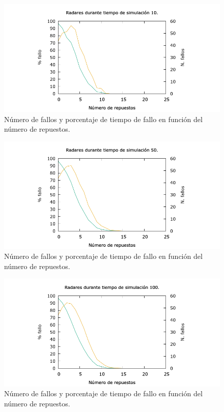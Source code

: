 \documentclass[12pt, spanish]{article}
\begin{document}
\begin{figure}[H]
	\centering
	\includegraphics[scale = 0.6]{radares_10.png}
	\caption{Número de fallos y porcentaje de tiempo de fallo en función del número de repuestos.}
	\label{fig:ej4}
\end{figure}

\begin{figure}[H]
	\centering
	\includegraphics[scale = 0.6]{radares_50.png}
	\caption{Número de fallos y porcentaje de tiempo de fallo en función del número de repuestos.}
	\label{fig:ej4}
\end{figure}

\begin{figure}[H]
	\centering
	\includegraphics[scale = 0.6]{radares_100.png}
	\caption{Número de fallos y porcentaje de tiempo de fallo en función del número de repuestos.}
	\label{fig:ej4}
\end{figure}
\end{document}
